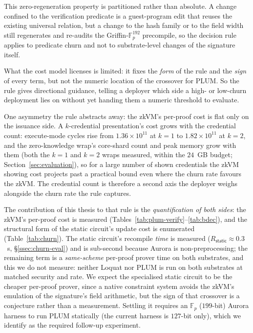 \noindent This zero-regeneration property is partitioned rather than absolute. A change confined to the verification predicate is a guest-program edit that reuses the existing universal relation, but a change to the hash family or to the field width still regenerates and re-audits the Griffin-$\mathbb{F}_p^{192}$ precompile, so the decision rule applies to predicate churn and not to substrate-level changes of the signature itself.

\noindent What the cost model licenses is limited: it fixes the \emph{form} of the rule and the \emph{sign} of every term, but not the numeric location of the crossover for PLUM. So the rule gives directional guidance, telling a deployer which side a high- or low-churn deployment lies on without yet handing them a numeric threshold to evaluate.

\noindent One asymmetry the rule abstracts away: the zkVM's per-proof cost is flat only on the issuance side. A $k$-credential presentation's cost grows with the credential count: execute-mode cycles rise from $1.36\times10^{11}$ at $k=1$ to $1.82\times10^{11}$ at $k=2$, and the zero-knowledge wrap's core-shard count and peak memory grow with them (both the $k=1$ and $k=2$ wraps measured, within the $24$~GB budget; Section~\ref{sec:evaluation}), so for a large number of shown credentials the zkVM showing cost projects past a practical bound even where the churn rate favours the zkVM. The credential count is therefore a second axis the deployer weighs alongside the churn rate the rule captures.

\noindent The contribution of this thesis to that rule is the \emph{quantification of both sides}: the zkVM's per-proof cost is measured (Tables~\ref{tab:plum-verify}--\ref{tab:bdec}), and the structural form of the static circuit's update cost is enumerated (Table~\ref{tab:churn}). The static circuit's recompile \emph{time} is measured ($R_{\mathsf{static}}\approx 0.3$~s, \S\ref{ssec:churn-eval}) and is sub-second because Aurora is non-preprocessing; the remaining term is a \emph{same-scheme} per-proof prover time on both substrates, and this we do not measure: neither Loquat nor PLUM is run on both substrates at matched security and rate. We expect the specialised static circuit to be the cheaper per-proof prover, since a native constraint system avoids the zkVM's emulation of the signature's field arithmetic, but the sign of that crossover is a conjecture rather than a measurement. Settling it requires an $\mathbb{F}_p$ ($199$-bit) Aurora harness to run PLUM statically (the current harness is $127$-bit only), which we identify as the required follow-up experiment.

